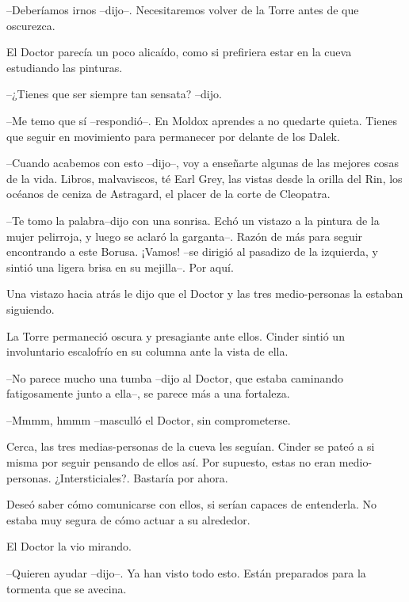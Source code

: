 --Deberíamos irnos --dijo--. Necesitaremos volver de la Torre antes de que oscurezca.



El Doctor parecía un poco alicaído, como si prefiriera estar en la cueva estudiando las pinturas. 



--¿Tienes que ser siempre tan sensata? --dijo.

--Me temo que sí --respondió--. En Moldox aprendes a no quedarte quieta. Tienes que seguir en movimiento para permanecer por delante de los Dalek.

--Cuando acabemos con esto --dijo--, voy a enseñarte algunas de las mejores cosas de la vida. Libros, malvaviscos, té Earl Grey, las vistas desde la orilla del Rin, los océanos de ceniza de Astragard, el placer de la corte de Cleopatra.

--Te tomo la palabra--dijo con una sonrisa. Echó un vistazo a la pintura de la mujer pelirroja, y luego se aclaró la garganta--. Razón de más para seguir encontrando a este Borusa. ¡Vamos! --se dirigió al pasadizo de la izquierda, y sintió una ligera brisa en su mejilla--. Por aquí.



Una vistazo hacia atrás le dijo que el Doctor y las tres medio-personas la estaban siguiendo.

La Torre permaneció oscura y presagiante ante ellos. Cinder sintió un involuntario escalofrío en su columna ante la vista de ella. 



--No parece mucho una tumba --dijo al Doctor, que estaba caminando fatigosamente junto a ella--, se parece más a una fortaleza.

--Mmmm, hmmm --masculló el Doctor, sin comprometerse.



Cerca, las tres medias-personas de la cueva les seguían. Cinder se pateó a si misma por seguir pensando de ellos así. Por supuesto, estas no eran medio-personas. ¿Intersticiales?. Bastaría por ahora.

Deseó saber cómo comunicarse con ellos, si serían capaces de entenderla. No estaba muy segura de cómo actuar a su alrededor.

El Doctor la vio mirando. 



--Quieren ayudar --dijo--. Ya han visto todo esto. Están preparados para la tormenta que se avecina.



